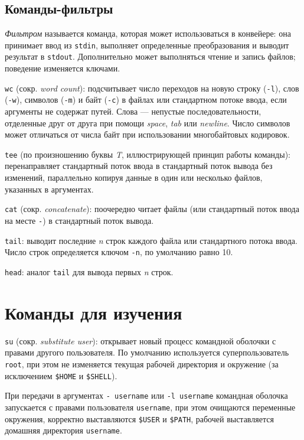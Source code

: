 \documentclass[listings]{labreport}
\begin{document}

\subsection*{Команды-фильтры}

\textit{Фильтром} называется команда, которая может использоваться в конвейере: она принимает ввод из
\texttt{stdin}, выполняет определенные преобразования и выводит результат в \texttt{stdout}. Дополнительно
может выполняться чтение и запись файлов; поведение изменяется ключами.

\texttt{wc} (сокр. \textit{word count}): подсчитывает число переходов на новую строку (\texttt{-l}),
слов (\texttt{-w}), символов (\texttt{-m}) и байт (\texttt{-c}) в файлах или стандартном потоке ввода,
если аргументы не содержат путей. Слова — непустые последовательности,
отделенные друг от друга при помощи \textit{space}, \textit{tab} или \textit{newline}. Число символов
может отличаться от числа байт при использовании многобайтовых кодировок.

\texttt{tee} (по произношению буквы \textit{T}, иллюстрирующей принцип работы команды): перенаправляет
стандартный поток ввода в стандартный поток вывода без изменений, параллельно копируя данные
в один или несколько файлов, указанных в аргументах.

\texttt{cat} (сокр. \textit{concatenate}): поочередно читает файлы (или стандартный поток ввода на месте \texttt{-})
в стандартный поток вывода. 

\texttt{tail}: выводит последние \textit{n} строк каждого файла или стандартного потока ввода.
Число строк определяется ключом \texttt{-n}, по умолчанию равно 10.

\texttt{head}: аналог \texttt{tail} для вывода первых \textit{n} строк.


\section*{Команды для изучения}

\texttt{su} (сокр. \textit{substitute user}): открывает новый процесс командной оболочки с правами другого пользователя.
По умолчанию используется суперпользователь \texttt{root}, при этом не изменяется текущая рабочей директория и
окружение (за исключением \texttt{\$HOME} и \texttt{\$SHELL}).

При передачи в аргументах \texttt{- username} или \texttt{-l username} командная оболочка запускается с правами
пользователя \texttt{username}, при этом очищаются переменные окружения, корректно выставляются \texttt{\$USER} и \texttt{\$PATH},
рабочей выставляется домашняя директория \texttt{username}.
\end{document}
